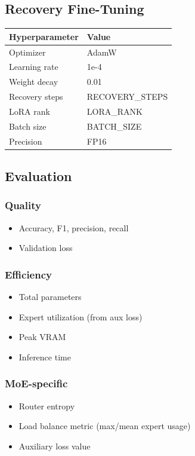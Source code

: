 \subsection{Recovery Fine-Tuning}

\begin{table}[H]
\centering
\small
\begin{tabular}{ll}
\toprule
\textbf{Hyperparameter} & \textbf{Value} \\
\midrule
Optimizer & AdamW \\
Learning rate & 1e-4 \\
Weight decay & 0.01 \\
Recovery steps & {{RECOVERY\_STEPS}} \\
LoRA rank & {{LORA\_RANK}} \\
Batch size & {{BATCH\_SIZE}} \\
Precision & FP16 \\
\bottomrule
\end{tabular}
\end{table}

\subsection{Evaluation}

\subsubsection{Quality}
\begin{itemize}
\item Accuracy, F1, precision, recall
\item Validation loss

\end{itemize}
\subsubsection{Efficiency}
\begin{itemize}
\item Total parameters
\item Expert utilization (from aux loss)
\item Peak VRAM
\item Inference time

\end{itemize}
\subsubsection{MoE-specific}
\begin{itemize}
\item Router entropy
\item Load balance metric (max/mean expert usage)
\item Auxiliary loss value

\end{itemize}
